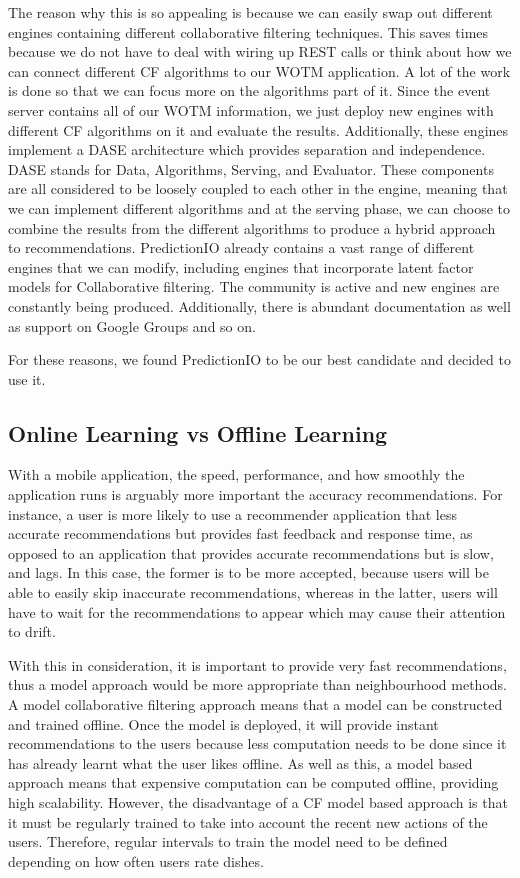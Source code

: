 The reason why this is so appealing is because we can easily swap out different engines containing different collaborative filtering techniques. This saves times because we do not have to deal with wiring up REST calls or think about how we can connect different CF algorithms to our WOTM application. A lot of the work is done so that we can focus more on the algorithms part of it. Since the event server contains all of our WOTM information, we just deploy new engines with different CF algorithms on it and evaluate the results. Additionally, these engines implement a DASE architecture which provides separation and independence. DASE stands for Data, Algorithms, Serving, and Evaluator. These components are all considered to be loosely coupled to each other in the engine, meaning that we can implement different algorithms and at the serving phase, we can choose to combine the results from the different algorithms to produce a hybrid approach to recommendations. 
PredictionIO already contains a vast range of different engines that we can modify, including engines that incorporate latent factor models for Collaborative filtering. The community is active and new engines are constantly being produced. Additionally, there is abundant documentation as well as support on Google Groups and so on. 

For these reasons, we found PredictionIO to be our best candidate and decided to use it. 

\subsection{Online Learning vs Offline Learning}

With a mobile application, the speed, performance, and how smoothly the application runs is arguably more important the accuracy recommendations. For instance, a user is more likely to use a recommender application that less accurate recommendations but provides fast feedback and response time, as opposed to an application that provides accurate recommendations but is slow, and lags. In this case, the former is to be more accepted, because users will be able to easily skip inaccurate recommendations, whereas in the latter, users will have to wait for the recommendations to appear which may cause their attention to drift. 

With this in consideration, it is important to provide very fast recommendations, thus a model approach would be more appropriate than neighbourhood methods. A model collaborative filtering approach means that a model can be constructed and trained offline. Once the model is deployed, it will provide instant recommendations to the users because less computation needs to  be done since it has already learnt what the user likes offline. As well as this, a model based approach means that expensive computation can be computed offline, providing high scalability. However, the disadvantage of a CF model based approach is that it must be regularly trained to take into account the recent new actions of the users. Therefore, regular intervals to train the model need to be defined depending on how often users rate dishes.

